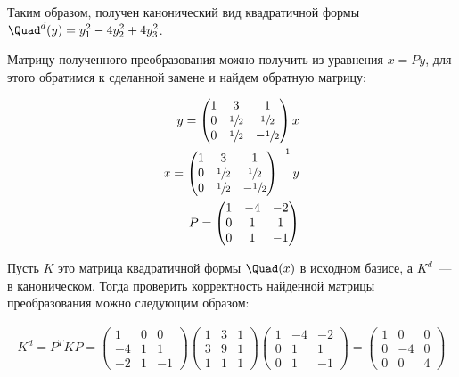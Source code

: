 Таким образом, получен канонический вид квадратичной формы 
\(\Quad^{d}(y) = y_{1}^2 - 4 y_{2}^2 + 4 y_{3}^2\).

Матрицу полученного преобразования можно получить из уравнения \(x = P y\), для
этого обратимся к сделанной замене и найдем обратную матрицу:

\begin{align*}
  y = \begin{pmatrix}
    1 & 3            & 1             \\
    0 & \sfrac{1}{2} & \sfrac{1}{2}  \\
    0 & \sfrac{1}{2} & -\sfrac{1}{2}
  \end{pmatrix}
  x
  \\
  x = \begin{pmatrix}
    1 & 3            & 1             \\
    0 & \sfrac{1}{2} & \sfrac{1}{2}  \\
    0 & \sfrac{1}{2} & -\sfrac{1}{2}
  \end{pmatrix}^{-1}
  y
  \\
  P = \begin{pmatrix}
    1 & -4 & -2 \\
    0 &  1 &  1 \\
    0 &  1 & -1
  \end{pmatrix}
\end{align*}

Пусть \(K\) это матрица квадратичной формы \(\Quad(x)\) в исходном базисе, а
\(K^{d}\)~--- в каноническом. Тогда проверить корректность найденной матрицы
преобразования можно следующим образом:

\begin{align*}
  K^{d} = P^{T} K P = 
  \begin{pmatrix}
    1  & 0 &  0 \\
    -4 & 1 &  1 \\
    -2 & 1 & -1
  \end{pmatrix}
  \begin{pmatrix}
    1 & 3 & 1 \\
    3 & 9 & 1 \\
    1 & 1 & 1
  \end{pmatrix}
  \begin{pmatrix}
    1 & -4 & -2 \\
    0 &  1 &  1 \\
    0 &  1 & -1
  \end{pmatrix}
  =
  \begin{pmatrix}
    1 &  0 & 0 \\
    0 & -4 & 0 \\
    0 &  0 & 4
  \end{pmatrix}
\end{align*}

